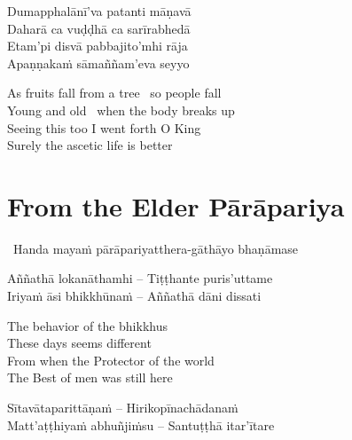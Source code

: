 \begin{verses}
  Dumapphalānī'va patanti māṇavā\\
  Daharā ca vuḍḍhā ca sarīrabhedā\\
  Etam'pi disvā pabbajito'mhi rāja\\
  Apaṇṇakaṁ sāmaññam'eva seyyo
\end{verses}

\begin{english-verses}
  As fruits fall from a tree \breathmark\ so people fall\\
  Young and old \breathmark\ when the body breaks up\\
  Seeing this too I went forth O King\\
  Surely the ascetic life is better
\end{english-verses}

\suttaRef{[Thag 16.4 / MN 82]}


\section{From the Elder Pārāpariya}
\label{parapariya}

\begin{leader}
  \anglebracketleft\ \hspace{-0.5mm}Handa mayaṁ pārāpariyatthera-gāthāyo bhaṇāmase \hspace{-0.5mm}\anglebracketright\
\end{leader}

\begin{verses}
  Aññathā lokanāthamhi – Tiṭṭhante puris'uttame\\
  Iriyaṁ āsi bhikkhūnaṁ – Aññathā dāni dissati
\end{verses}

\begin{english-verses}
  The behavior of the bhikkhus\\
  These days seems different\\
  From when the Protector of the world\\
  The Best of men was still here
\end{english-verses}

\begin{verses}
  Sītavātaparittāṇaṁ – Hirikopīnachādanaṁ\\
  Matt'aṭṭhiyaṁ abhuñjiṁsu – Santuṭṭhā itar'ītare
\end{verses}


